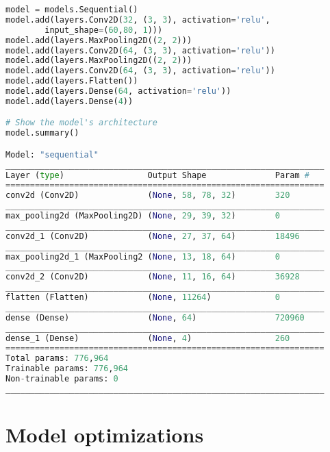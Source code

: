 \begin{lstlisting}[language=Python]
model = models.Sequential()
model.add(layers.Conv2D(32, (3, 3), activation='relu', 
        input_shape=(60,80, 1)))
model.add(layers.MaxPooling2D((2, 2)))
model.add(layers.Conv2D(64, (3, 3), activation='relu'))
model.add(layers.MaxPooling2D((2, 2)))
model.add(layers.Conv2D(64, (3, 3), activation='relu'))
model.add(layers.Flatten())
model.add(layers.Dense(64, activation='relu'))
model.add(layers.Dense(4))

# Show the model's architecture
model.summary()

Model: "sequential"
_________________________________________________________________
Layer (type)                 Output Shape              Param #   
=================================================================
conv2d (Conv2D)              (None, 58, 78, 32)        320       
_________________________________________________________________
max_pooling2d (MaxPooling2D) (None, 29, 39, 32)        0         
_________________________________________________________________
conv2d_1 (Conv2D)            (None, 27, 37, 64)        18496     
_________________________________________________________________
max_pooling2d_1 (MaxPooling2 (None, 13, 18, 64)        0         
_________________________________________________________________
conv2d_2 (Conv2D)            (None, 11, 16, 64)        36928     
_________________________________________________________________
flatten (Flatten)            (None, 11264)             0         
_________________________________________________________________
dense (Dense)                (None, 64)                720960    
_________________________________________________________________
dense_1 (Dense)              (None, 4)                 260       
=================================================================
Total params: 776,964
Trainable params: 776,964
Non-trainable params: 0
_________________________________________________________________
\end{lstlisting}


\section{ Model optimizations}


